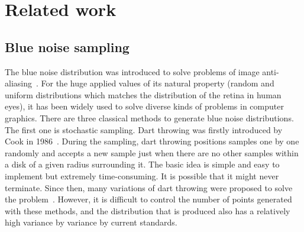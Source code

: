 \section{Related work}

\subsection{Blue noise sampling}
The blue noise distribution was introduced to solve
problems of image anti-aliasing~\cite{dippe:1985:antialiasing}. For
the huge applied values of its natural property (random and uniform
distributions which matches the distribution of the retina  in human eyes),
it has been widely used to solve diverse kinds of problems in computer
graphics.
There are three classical methods to generate blue noise
distributions.
The first one is stochastic sampling.
Dart throwing was firstly introduced by
Cook in 1986~\cite{cook:1986:stochastic}.
During the sampling, dart throwing positions
samples one by one randomly and accepts a new sample just when there are no
other samples within a disk of a given radius surrounding it.
The basic idea
is simple and easy to implement but extremely time-consuming.
It is possible that it might never terminate.
Since then, many variations of dart throwing were proposed to
solve the problem~\cite{Mitchell:1987:generating,dunbar:2006:spatial,white:2007:poisson,wei:2008:parallel,gamito:2009:accurate,ebeida:2011:efficient}.
However, it is difficult to control the number of points generated with these methods,
and the distribution that is produced also
has a relatively high variance by variance by current standards.

